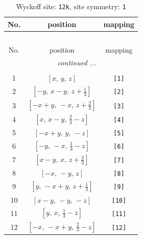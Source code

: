 \documentclass[fleqn,8pt]{jsarticle}
\begin{document}
\renewcommand{\arraystretch}{1.2}
\begin{longtable}{ccc}
\caption{Wyckoff site: {\tt 12k}, site symmetry: {\tt 1}}
 \\
 \hline \hline
No. & position & mapping \\ \hline \endfirsthead

\multicolumn{2}{l}{\tablename\ \thetable{}} \\
 \hline \hline
No. & position & mapping \\ \hline \endhead

 \hline \hline
\multicolumn{2}{r}{\footnotesize\it continued ...} \\ \endfoot

 \hline \hline
\multicolumn{2}{r}{} \\ \endlastfoot

1 & $\left[ x,\, y,\, z \right]$ & {\tt [1]} \\ \hline
2 & $\left[ - y,\, x - y,\, z + \frac{1}{3} \right]$ & {\tt [2]} \\ \hline
3 & $\left[ - x + y,\, - x,\, z + \frac{2}{3} \right]$ & {\tt [3]} \\ \hline
4 & $\left[ x,\, x - y,\, \frac{2}{3} - z \right]$ & {\tt [4]} \\ \hline
5 & $\left[ - x + y,\, y,\, - z \right]$ & {\tt [5]} \\ \hline
6 & $\left[ - y,\, - x,\, \frac{1}{3} - z \right]$ & {\tt [6]} \\ \hline
7 & $\left[ x - y,\, x,\, z + \frac{2}{3} \right]$ & {\tt [7]} \\ \hline
8 & $\left[ - x,\, - y,\, z \right]$ & {\tt [8]} \\ \hline
9 & $\left[ y,\, - x + y,\, z + \frac{1}{3} \right]$ & {\tt [9]} \\ \hline
10 & $\left[ x - y,\, - y,\, - z \right]$ & {\tt [10]} \\ \hline
11 & $\left[ y,\, x,\, \frac{1}{3} - z \right]$ & {\tt [11]} \\ \hline
12 & $\left[ - x,\, - x + y,\, \frac{2}{3} - z \right]$ & {\tt [12]} \\
\end{longtable}
\end{document}
